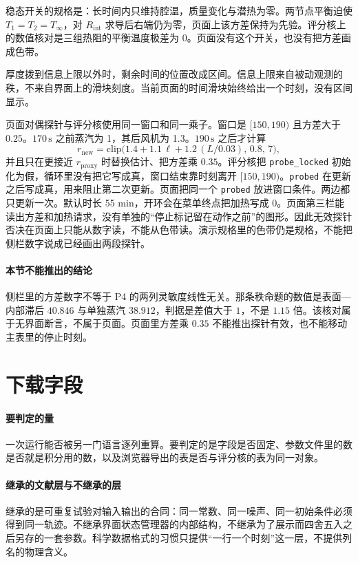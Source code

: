 稳态开关的规格是：长时间内只维持腔温，质量变化与潜热为零。两节点平衡迫使 $T_1=T_2=T_\infty$，对 $R_{\mathrm{int}}$ 求导后右端仍为零，页面上该方差保持为先验。评分核上的数值核对是三组热阻的平衡温度极差为 $0$。页面没有这个开关，也没有把方差画成色带。

厚度拨到信息上限以外时，剩余时间的位置改成区间。信息上限来自被动观测的秩，不来自界面上的滑块刻度。当前页面的时间滑块始终给出一个时刻，没有区间显示。

页面对偶探针与评分核使用同一窗口和同一乘子。窗口是 $[150,190)$ 且方差大于 $0.25$。$170\,\mathrm{s}$ 之前蒸汽为 1，其后风机为 1.3。$190\,\mathrm{s}$ 之后才计算
\[
r_{\mathrm{new}}=\mathrm{clip}\big(1.4+1.1\,\ell+1.2\,(L/0.03),\,0.8,\,7\big),
\]
并且只在更接近 $r_{\mathrm{proxy}}$ 时替换估计、把方差乘 $0.35$。评分核把 \texttt{probe\_locked} 初始化为假，循环里没有把它写成真，窗口结束靠时刻离开 $[150,190)$。\texttt{probed} 在更新之后写成真，用来阻止第二次更新。页面把同一个 \texttt{probed} 放进窗口条件。两边都只更新一次。默认时长 55 min，开环会在菜单终点把加热写成 0。页面第三栏能读出方差和加热请求，没有单独的“停止标记留在动作之前”的图形。因此无效探针否决在页面上只能从数字读，不能从色带读。演示规格里的色带仍是规格，不能把侧栏数字说成已经画出两段探针。

\paragraph{本节不能推出的结论}
侧栏里的方差数字不等于 P4 的两列灵敏度线性无关。那条秩命题的数值是表面—内部滞后 $40.846$ 与单独蒸汽 $38.912$，判据是差值大于 $1$，不是 $1.15$ 倍。该核对属于无界面断言，不属于页面。页面里方差乘 $0.35$ 不能推出探针有效，也不能移动主表里的停止时刻。

\section{下载字段}

\paragraph{要判定的量}
一次运行能否被另一门语言逐列重算。要判定的是字段是否固定、参数文件里的数是否就是积分用的数，以及浏览器导出的表是否与评分核的表为同一对象。

\paragraph{继承的文献层与不继承的层}
继承的是可重复试验对输入输出的合同：同一常数、同一噪声、同一初始条件必须得到同一轨迹。不继承界面状态管理器的内部结构，不继承为了展示而四舍五入之后另存的一套参数。科学数据格式的习惯只提供“一行一个时刻”这一层，不提供列名的物理含义。

